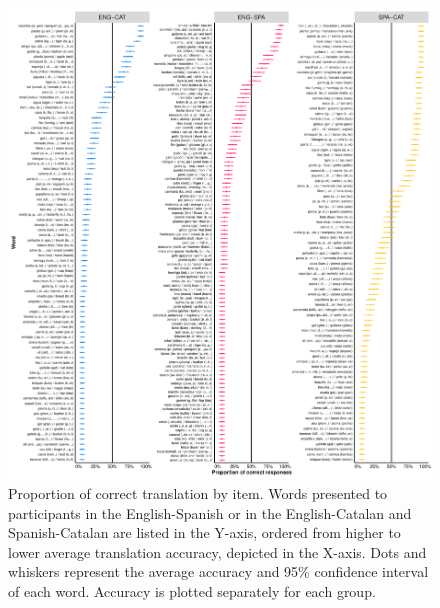 \documentclass[
  english,
  man,floatsintext]{apa6}
\begin{document}
\begin{figure}
\centering
\includegraphics{manuscript_files/figure-latex/accuracy-1.pdf}
\caption{\label{fig:accuracy}Proportion of correct translation by item. Words presented to participants in the English-Spanish or in the English-Catalan and Spanish-Catalan are listed in the Y-axis, ordered from higher to lower average translation accuracy, depicted in the X-axis. Dots and whiskers represent the average accuracy and 95\% confidence interval of each word. Accuracy is plotted separately for each group.}
\end{figure}
\end{document}
